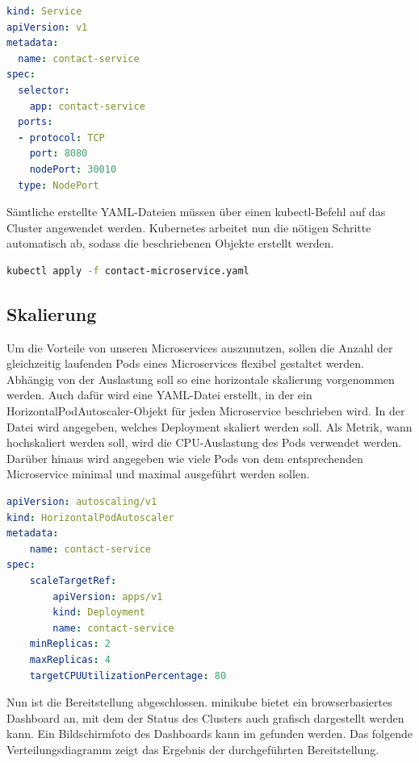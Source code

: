 \begin{lstlisting}[language=YAML, caption=Service-Objekt vom Kontakt-Microservice, captionpos=b]
kind: Service
apiVersion: v1
metadata:
  name: contact-service
spec:
  selector:
    app: contact-service
  ports:
  - protocol: TCP
    port: 8080
    nodePort: 30010
  type: NodePort
\end{lstlisting}

Sämtliche erstellte YAML-Dateien müssen über einen kubectl-Befehl auf das Cluster angewendet werden. Kubernetes arbeitet nun die nötigen Schritte automatisch ab, sodass die beschriebenen Objekte erstellt werden.

\begin{lstlisting}[language=bash, caption=kubectl-Befehl für das Anwenden einer YAML-Datei, captionpos=b]
kubectl apply -f contact-microservice.yaml
\end{lstlisting}

\subsection{Skalierung}

Um die Vorteile von unseren Microservices auszunutzen, sollen die Anzahl der gleichzeitig laufenden Pods eines Microservices flexibel gestaltet werden. Abhängig von der Auslastung soll so eine horizontale skalierung vorgenommen werden. Auch dafür wird eine YAML-Datei erstellt, in der ein HorizontalPodAutoscaler-Objekt für jeden Microservice beschrieben wird. In der Datei wird angegeben, welches Deployment skaliert werden soll. Als Metrik, wann hochskaliert werden soll, wird die CPU-Auslastung des Pods verwendet werden. Darüber hinaus wird angegeben wie viele Pods von dem entsprechenden Microservice minimal und maximal ausgeführt werden sollen.

\begin{lstlisting}[language=YAML, caption=Befehl , captionpos=b]
apiVersion: autoscaling/v1
kind: HorizontalPodAutoscaler
metadata:
    name: contact-service
spec:
    scaleTargetRef:
        apiVersion: apps/v1
        kind: Deployment
        name: contact-service
    minReplicas: 2
    maxReplicas: 4
    targetCPUUtilizationPercentage: 80
\end{lstlisting}

Nun ist die Bereitstellung abgeschlossen. minikube bietet ein browserbasiertes Dashboard an, mit dem der Status des Clusters auch grafisch dargestellt werden kann. Ein Bildschirmfoto des Dashboards kann im  gefunden werden. Das folgende Verteilungsdiagramm zeigt das Ergebnis der durchgeführten Bereitstellung.

